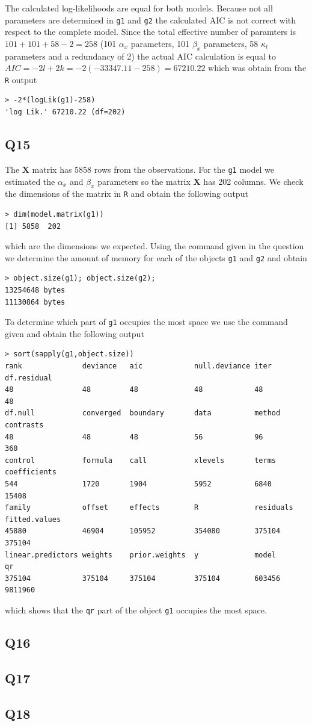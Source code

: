 \documentclass[11pt]{article}
\begin{document}
The calculated log-likelihoods are equal for both models. Because not all parameters are determined in \verb|g1| and \verb|g2| the calculated AIC is not correct with respect to the complete model. Since the total effective number of paramters is $101+101+58 - 2 = 258$ (101 $\alpha_x$ parameters, 101 $\beta_x$ parameters, 58 $\kappa_t$ parameters and a redundancy of 2) the actual AIC calculation is equal to $AIC = -2 l + 2 k = -2 (-33347.11 - 258) = 67210.22$ which was obtain from the \verb|R| output 
\begin{verbatim}
> -2*(logLik(g1)-258)
'log Lik.' 67210.22 (df=202)
\end{verbatim}


\subsection*{Q15}

The $\mathbf{X}$ matrix has 5858 rows from the observations. For the \verb|g1| model we estimated the $\alpha_x$ and $\beta_x$ parameters so the matrix $\mathbf{X}$ has 202 columns. We check the dimensions of the matrix in \verb|R| and obtain the following output
\begin{verbatim}
> dim(model.matrix(g1))
[1] 5858  202
\end{verbatim} 
which are the dimensions we expected. Using the command given in the question we determine the amount of memory for each of the objects \verb|g1| and \verb|g2| and obtain
\begin{verbatim}
> object.size(g1); object.size(g2);
13254648 bytes
11130864 bytes
\end{verbatim}	
To determine which part of \verb|g1| occupies the most space we use the command given and obtain the following output
\begin{verbatim}
> sort(sapply(g1,object.size))
rank              deviance   aic            null.deviance iter   df.residual 
48                48         48             48            48         48 
df.null           converged  boundary       data          method     contrasts 
48                48         48             56            96         360 
control           formula    call           xlevels       terms      coefficients 
544               1720       1904           5952          6840       15408 
family            offset     effects        R             residuals  fitted.values 
45880             46904      105952         354080        375104     375104 
linear.predictors weights    prior.weights  y             model      qr 
375104            375104     375104         375104        603456     9811960 
\end{verbatim}
which shows that the \verb|qr| part of the object \verb|g1| occupies the most space.

\subsection*{Q16}
	

\subsection*{Q17}


\subsection*{Q18}
\end{document}
